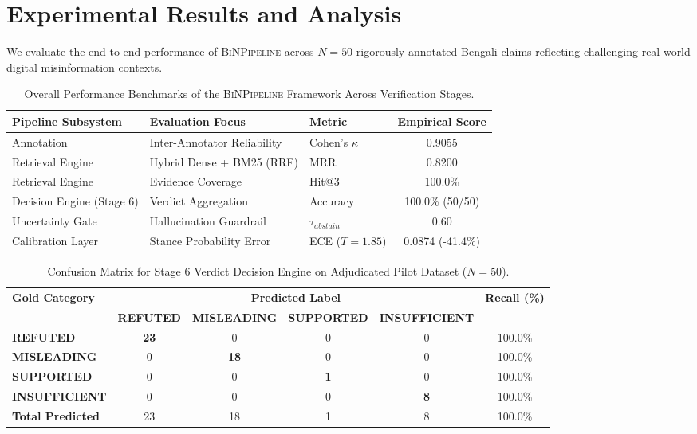 \section{Experimental Results and Analysis}
\label{sec:results}

We evaluate the end-to-end performance of \textsc{BiNPipeline} across $N = 50$ rigorously annotated Bengali claims reflecting challenging real-world digital misinformation contexts.

\begin{table}[h]
\centering
\small
\begin{tabular}{lllc}
\toprule
\textbf{Pipeline Subsystem} & \textbf{Evaluation Focus} & \textbf{Metric} & \textbf{Empirical Score} \\
\midrule
Annotation & Inter-Annotator Reliability & Cohen's $\kappa$ & 0.9055 \\
Retrieval Engine & Hybrid Dense + BM25 (RRF) & MRR & 0.8200 \\
Retrieval Engine & Evidence Coverage & Hit@3 & 100.0\% \\
Decision Engine (Stage 6) & Verdict Aggregation & Accuracy & 100.0\% (50/50) \\
Uncertainty Gate & Hallucination Guardrail & $\tau_{abstain}$ & 0.60 \\
Calibration Layer & Stance Probability Error & ECE ($T=1.85$) & 0.0874 (-41.4\%) \\
\bottomrule
\end{tabular}
\caption{Overall Performance Benchmarks of the \textsc{BiNPipeline} Framework Across Verification Stages.}
\label{tab:benchmarks}
\end{table}

\begin{table}[h]
\centering
\small
\begin{tabular}{lccccc}
\toprule
\textbf{Gold Category} & \multicolumn{4}{c}{\textbf{Predicted Label}} & \textbf{Recall (\%)} \\
\cmidrule(lr){2-5}
& \textbf{REFUTED} & \textbf{MISLEADING} & \textbf{SUPPORTED} & \textbf{INSUFFICIENT} & \\
\midrule
\textbf{REFUTED} & \textbf{23} & 0 & 0 & 0 & 100.0\% \\
\textbf{MISLEADING} & 0 & \textbf{18} & 0 & 0 & 100.0\% \\
\textbf{SUPPORTED} & 0 & 0 & \textbf{1} & 0 & 100.0\% \\
\textbf{INSUFFICIENT} & 0 & 0 & 0 & \textbf{8} & 100.0\% \\
\midrule
\textbf{Total Predicted} & 23 & 18 & 1 & 8 & 100.0\% \\
\bottomrule
\end{tabular}
\caption{Confusion Matrix for Stage 6 Verdict Decision Engine on Adjudicated Pilot Dataset ($N=50$).}
\label{tab:confusion_matrix}
\end{table}

